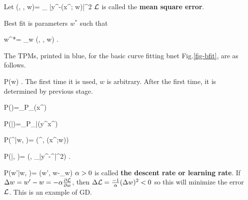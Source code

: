Let 
\beq
\call(\vecx, \vecy, w)=
\sum_\s
|y^\s-\haty(x^\s; w)|^2
\;
\eeq
${\cal L}$ is called the {\bf mean square error}.

Best fit is parameters $w^*$
such that

\beq 
w^*= \argmin_w
\call(\vecx, \vecy, w)
\;.
\eeq

The TPMs, printed in blue, for
the basic curve fitting bnet
 Fig.\ref{fig-bfit}, are
as follows.

\beq\color{blue}
P(w) 
\;.
\eeq
The first time
it is used, $w$ is arbitrary.
After the first time, it is determined 
by previous stage.

\beq\color{blue}
P(\vecx)=\prod_\s P_\rvx(x^\s)
\eeq

\beq\color{blue}
P(\vecy|\vecx)=\prod_\s P_{\rvy|\rvx}(y^\s\cond x^\s)
\eeq

\beq\color{blue}
P(\haty^\s|w, \vecx)=
\delta(\haty^\s, \haty(x^\s;w))
\eeq


\beq\color{blue}
P(\call|\vec{\haty}, \vecy)=
\delta(\call,
\sum_\s |y^\s-\haty^\s|^2)
\;.
\eeq


\beq\color{blue}
P(w'|w, \call)=
\delta(w',
w-\alp\partial_w\call)
\eeq
$\alpha>0$ is called {\bf the descent rate or learning rate}.
If $\Delta w=w'-w=-\alpha 
\frac{\partial{\cal L}}
{\partial w}$, then
 $\Delta {\cal L}=\frac{-1}{\alpha}
(\Delta w)^2<0$  so this will
minimize the error
${\cal L}$.
This is an example of GD.